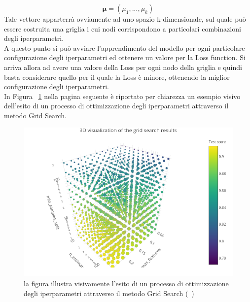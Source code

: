 \begin{equation}
\bm{\mu} = (\mu_1,...,\mu_k)
\end{equation}
Tale vettore apparterrà ovviamente ad uno spazio k-dimensionale, sul quale può essere costruita una griglia i cui nodi corrispondono a particolari combinazioni degli iperparametri. \\
A questo punto si può avviare l'apprendimento del modello per ogni particolare configurazione degli iperparametri ed ottenere un valore per la Loss function. Si arriva allora ad avere una valore della Loss per ogni nodo della griglia e quindi basta considerare quello per il quale la Loss è minore, ottenendo la miglior configurazione degli iperparametri. \\
In Figura ~\ref{fig:Grid Search} nella pagina seguente è riportato per chiarezza un esempio visivo dell'esito di un processo di ottimizzazione degli iperparametri attraverso il metodo Grid Search.

\begin{figure}[h!]
	\includegraphics[width=\linewidth]{figs/Grid_immagine.png}
	\caption{la figura illustra visivamente l'esito di un processo di ottimizzazione degli iperparametri attraverso il metodo Grid Search (~\cite{knuthwebsite})}
	\label{fig:Grid Search}
\end{figure}
\newpage 

